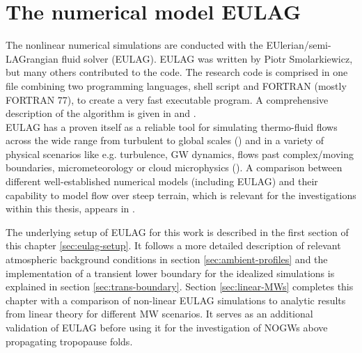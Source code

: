 \chapter{The numerical model EULAG}
\label{sec:EULAG}
The nonlinear numerical simulations are conducted with the EUlerian/semi- LAGrangian fluid solver (EULAG). EULAG was written by Piotr Smolarkiewicz, but many others contributed to the code. The research code is comprised in one file combining two programming languages, shell script and FORTRAN (mostly FORTRAN 77), to create a very fast executable program. A comprehensive description of the algorithm is given in \textcite[]{smolarkiewicz_forward--time_1997} and \textcite[]{smolarkiewicz_mpdata_1998}. \\
EULAG has a proven itself as a reliable tool for simulating thermo-fluid flows across the wide range from turbulent to global scales (\cite{prusa_all-scale_2003}) and in a variety of physical scenarios like e.g. turbulence, GW dynamics, flows past complex/moving boundaries, micrometeorology or cloud microphysics (\cite{prusa_eulag_2008}). A comparison between different well-established numerical models (including EULAG) and their capability to model flow over steep terrain, which is relevant for the investigations within this thesis, appears in \textcite{doyle_intercomparison_2011}.

The underlying setup of EULAG for this work is described in the first section of this chapter \ref{sec:eulag-setup}. It follows a more detailed description of relevant atmospheric background conditions in section \ref{sec:ambient-profiles} and the implementation of a transient lower boundary for the idealized simulations is explained in section \ref{sec:trans-boundary}. Section \ref{sec:linear-MWs} completes this chapter with a comparison of non-linear EULAG simulations to analytic results from linear theory for different MW scenarios. It serves as an additional validation of EULAG before using it for the investigation of NOGWs above propagating tropopause folds.

